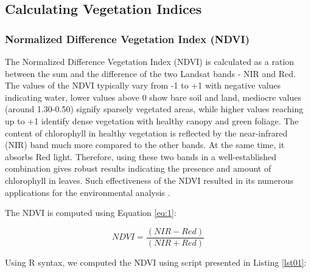 \documentclass[jimaging,article,submit,pdftex,moreauthors]{Definitions/mdpi}
\begin{document}
\subsection{Calculating Vegetation Indices}

\subsubsection{Normalized Difference Vegetation Index (NDVI)}
The Normalized Difference Vegetation Index (NDVI) \cite{Rouse} is calculated as a ration between the sum and the difference of the two Landsat bands - NIR and Red. The values of the NDVI typically vary from -1 to +1 with negative values indicating water, lower values above 0 show bare soil and land, mediocre values (around 1.30-0.50) signify sparsely vegetated areas, while higher values reaching up to +1 identify dense vegetation with healthy canopy and green foliage. The content of chlorophyll in healthy vegetation is reflected by the near-infrared (NIR) band much more compared to the other bands. At the same time, it absorbs Red light. Therefore, using these two bands in a well-established combination gives robust results indicating the presence and amount of chlorophyll in leaves. Such effectiveness of the NDVI resulted in its numerous applications for the environmental analysis \cite{w13192707,rs12244119,GHEBREZGABHER2020249,RULINDA2012169}. 

The NDVI is computed using Equation \ref{eq:1}:

\begin{equation}\label{eq:1}
NDVI=\dfrac{(NIR-Red)}{(NIR+Red)}
\end{equation}

Using R syntax, we computed the NDVI using script presented in Listing \ref{lst01}: 
\end{document}
